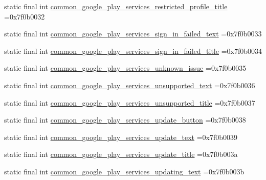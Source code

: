 \begin{DoxyCompactItemize}
\item 
static final int \mbox{\hyperlink{classbr_1_1unb_1_1cic_1_1mp_1_1marketmaster_1_1test_1_1R_1_1string_a50fc6ac074c3d06f78c36e4dc0db7016}{common\+\_\+google\+\_\+play\+\_\+services\+\_\+restricted\+\_\+profile\+\_\+title}} =0x7f0b0032
\item 
static final int \mbox{\hyperlink{classbr_1_1unb_1_1cic_1_1mp_1_1marketmaster_1_1test_1_1R_1_1string_acf91f5bcae3b38f218cd25cf330d871a}{common\+\_\+google\+\_\+play\+\_\+services\+\_\+sign\+\_\+in\+\_\+failed\+\_\+text}} =0x7f0b0033
\item 
static final int \mbox{\hyperlink{classbr_1_1unb_1_1cic_1_1mp_1_1marketmaster_1_1test_1_1R_1_1string_ac0dfbcd428e0eccc53e5d055a5b7f387}{common\+\_\+google\+\_\+play\+\_\+services\+\_\+sign\+\_\+in\+\_\+failed\+\_\+title}} =0x7f0b0034
\item 
static final int \mbox{\hyperlink{classbr_1_1unb_1_1cic_1_1mp_1_1marketmaster_1_1test_1_1R_1_1string_a21a08ac70c38fbd8034d166ae0c6fb49}{common\+\_\+google\+\_\+play\+\_\+services\+\_\+unknown\+\_\+issue}} =0x7f0b0035
\item 
static final int \mbox{\hyperlink{classbr_1_1unb_1_1cic_1_1mp_1_1marketmaster_1_1test_1_1R_1_1string_a233a2c5e39791b934bc61d77b3776f07}{common\+\_\+google\+\_\+play\+\_\+services\+\_\+unsupported\+\_\+text}} =0x7f0b0036
\item 
static final int \mbox{\hyperlink{classbr_1_1unb_1_1cic_1_1mp_1_1marketmaster_1_1test_1_1R_1_1string_aaf18b05b7b6de968c265f9b3e8bc8c0f}{common\+\_\+google\+\_\+play\+\_\+services\+\_\+unsupported\+\_\+title}} =0x7f0b0037
\item 
static final int \mbox{\hyperlink{classbr_1_1unb_1_1cic_1_1mp_1_1marketmaster_1_1test_1_1R_1_1string_a08681356055135a1377ba8f2d23e1a3a}{common\+\_\+google\+\_\+play\+\_\+services\+\_\+update\+\_\+button}} =0x7f0b0038
\item 
static final int \mbox{\hyperlink{classbr_1_1unb_1_1cic_1_1mp_1_1marketmaster_1_1test_1_1R_1_1string_a78777f5ed7b2337596f4e3ed5f939879}{common\+\_\+google\+\_\+play\+\_\+services\+\_\+update\+\_\+text}} =0x7f0b0039
\item 
static final int \mbox{\hyperlink{classbr_1_1unb_1_1cic_1_1mp_1_1marketmaster_1_1test_1_1R_1_1string_ae422e403317c93676215c183cd2180f9}{common\+\_\+google\+\_\+play\+\_\+services\+\_\+update\+\_\+title}} =0x7f0b003a
\item 
static final int \mbox{\hyperlink{classbr_1_1unb_1_1cic_1_1mp_1_1marketmaster_1_1test_1_1R_1_1string_ab8e264a07862775cb542e1e1ba9a33ad}{common\+\_\+google\+\_\+play\+\_\+services\+\_\+updating\+\_\+text}} =0x7f0b003b

\end{DoxyCompactItemize}

